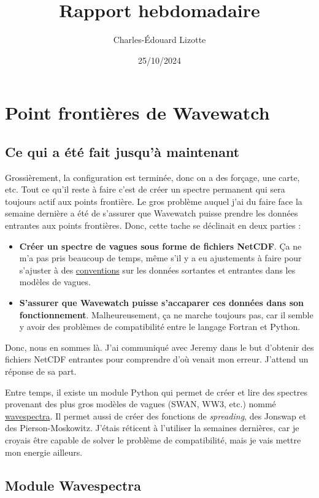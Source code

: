 \documentclass[10pt]{article}
\author{Charles-Édouard Lizotte}
\date{25/10/2024}
\title{Rapport hebdomadaire}
\numberwithin{equation}{section}
\begin{document}
\section{Point frontières de Wavewatch}
\label{sec:orgf09cdfc}

\subsection{Ce qui a été fait jusqu'à maintenant}
\label{sec:orgae0363a}

Grossièrement, la configuration est terminée, donc on a des forçage, une carte, etc. Tout ce qu'il reste à faire c'est de créer un spectre permanent qui sera toujours actif aux points frontière. Le gros problème auquel j'ai du faire face la semaine dernière a été de s'assurer que Wavewatch puisse prendre les données entrantes aux points frontières. Donc, cette tache se déclinait en deux parties :
\begin{itemize}
\item \textbf{Créer un spectre de vagues sous forme de fichiers NetCDF}. Ça ne m'a pas pris beaucoup de temps, même s'il y a eu ajustements à faire pour s'ajuster à des \href{https://wavespectra.readthedocs.io/en/latest/conventions.html}{conventions} sur les données sortantes et entrantes dans les modèles de vagues.
\item \textbf{S'assurer que Wavewatch puisse s'accaparer ces données dans son fonctionnement}. Malheureusement, ça ne marche toujours pas, car il semble y avoir des problèmes de compatibilité entre le langage Fortran et Python.
\end{itemize}

Donc, nous en sommes là. J'ai communiqué avec Jeremy dans le but d'obtenir des fichiers NetCDF entrantes pour comprendre d'où venait mon erreur. J'attend un réponse de sa part.

Entre temps, il existe un module Python qui permet de créer et lire des spectres provenant des plus gros modèles de vagues (SWAN, WW3, etc.) nommé \href{https://wavespectra.readthedocs.io/en/latest/index.html}{wavespectra}. Il permet aussi de créer des fonctions de \emph{spreading}, des Jonswap et des Pierson-Moskowitz. J'étais réticent à l'utiliser la semaines dernières, car je croyais être capable de solver le problème de compatibilité, mais je vais mettre mon energie ailleurs.
\subsection{Module Wavespectra}
\label{sec:org63a6326}
\end{document}
